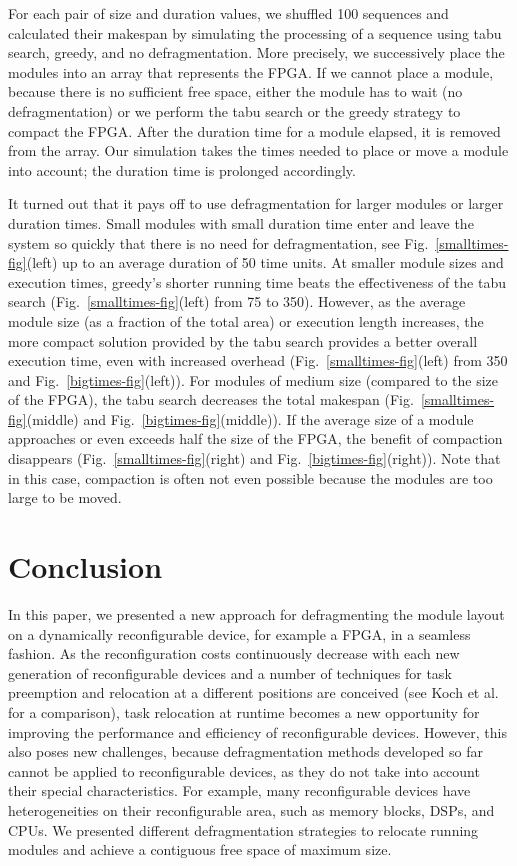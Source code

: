 \documentclass{article}
\begin{document}
For each pair of size and duration values, we shuffled 100 sequences and calculated their
makespan by simulating the processing of a sequence using 
tabu search, greedy, and no defragmentation. More precisely, we successively
place the modules into an array that represents the FPGA. 
If we cannot place a module, because there is no sufficient free space,
either the module has to wait (no defragmentation) or we perform
the tabu search or the greedy strategy to compact the FPGA. 
After the duration time for a module elapsed, it is removed from the array.
Our simulation takes the times needed to place or move a module into 
account; the duration time is prolonged accordingly. 

It turned out that it pays off to use defragmentation for larger modules or larger
duration times. Small modules with small duration time enter and leave the system
so quickly that there is no need for defragmentation, 
see Fig.~\ref{smalltimes-fig}(left) up to an average duration of 50 time units.
At smaller module sizes and execution times, greedy's shorter running
time beats the effectiveness of the tabu search 
(Fig.~\ref{smalltimes-fig}(left) from 75 to 350).
However, as the
average module size (as a fraction of the total area) or execution
length increases, the more compact solution provided by the tabu
search provides a better overall execution time, even with increased
overhead
(Fig.~\ref{smalltimes-fig}(left) from 350 and Fig.~\ref{bigtimes-fig}(left)).
For modules of medium size (compared to the size of the FPGA), the tabu search
decreases the total makespan (Fig.~\ref{smalltimes-fig}(middle) and Fig.~\ref{bigtimes-fig}(middle)).
If the average size of a module approaches or even exceeds half the size of the FPGA, the benefit
of compaction disappears (Fig.~\ref{smalltimes-fig}(right) and Fig.~\ref{bigtimes-fig}(right)).
Note that in this case, compaction is often not even possible because the
modules are too large to be moved.






\section{Conclusion}
\label{sec:conclusion}

In this paper, we presented a new approach for defragmenting the module
layout on a dynamically reconfigurable device, for example a FPGA, in
a seamless fashion. As the reconfiguration costs continuously decrease
with each new generation of reconfigurable devices and a number of
techniques for task preemption and relocation at a different positions
are conceived (see Koch et al.~\cite{KHT07} for a comparison), task
relocation at runtime becomes a new opportunity for improving the
performance and efficiency of reconfigurable devices. However, this
also poses new challenges, because defragmentation methods developed
so far cannot be applied to reconfigurable devices, as they do not take
into account their special characteristics. For example, many
reconfigurable devices have heterogeneities on their reconfigurable
area, such as memory blocks, DSPs, and CPUs. We presented different
defragmentation strategies to relocate running modules and achieve a
contiguous free space of maximum size.
\end{document}
